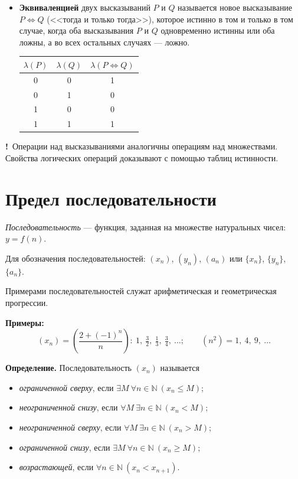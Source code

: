 \documentclass[a4paper,11pt]{article}
\newcommand{\imp}{\textbf{\color{red!70!black}!}\ }
\begin{document}
\begin{itemize}
  \item \textbf{Эквиваленцией} двух высказываний $P$ и $Q$ называется новое
    высказывание $P \Leftrightarrow Q$ (<<тогда и только тогда>>), которое
    истинно в том и только в том случае, когда оба высказывания $P$ и $Q$
    одновременно истинны или оба ложны, а во всех остальных случаях --- ложно.
    \begin{center}
    \begin{tabular}{c|c|c}
      $\lambda(P)$ & $\lambda(Q)$ & $\lambda(P \Leftrightarrow Q)$ \\ \hline
      0 & 0 & 1 \\
      0 & 1 & 0 \\
      1 & 0 & 0 \\
      1 & 1 & 1 \\
    \end{tabular}
    \end{center}
\end{itemize}

\imp Операции над высказываниями аналогичны операциям над множествами.
Свойства логических операций доказывают с помощью таблиц истинности.

\section{Предел последовательности}

\emph{Последовательность} --- функция, заданная на множестве
натуральных чисел: $y = f(n)$.

Для обозначения последовательностей: $(x_n)$, $(y_n)$, $(a_n)$ или
$\{x_n\}$, $\{y_n\}$, $\{a_n\}$.

Примерами последовательностей служат арифметическая и геометрическая
прогрессии.

\textbf{Примеры:}
\[
  (x_n) = \left( \frac{2 + (-1)^n}{n} \right) :\ 1,\ \tfrac32,\ \tfrac13,\ \tfrac34,\ \dots;
  \qquad
  (n^2) = 1,\ 4,\ 9,\ \dots
\]

\begin{opr}
\textbf{Определение.} Последовательность $(x_n)$ называется
\begin{itemize}
  \item \emph{ограниченной сверху}, если $\exists M\ \forall n \in \mathbb{N}\ (x_n \le M)$;
  \item \emph{неограниченной снизу}, если $\forall M\ \exists n \in \mathbb{N}\ (x_n < M)$;
  \item \emph{неограниченной сверху}, если $\forall M\ \exists n \in \mathbb{N}\ (x_n > M)$;
  \item \emph{ограниченной снизу}, если $\exists M\ \forall n \in \mathbb{N}\ (x_n \ge M)$;
  \item \emph{возрастающей}, если $\forall n \in \mathbb{N}\ (x_n < x_{n+1})$.
\end{itemize}
\end{opr}
\end{document}
